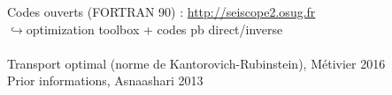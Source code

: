 \begin{frame}
	 	Codes ouverts (FORTRAN 90) : \url{ http://seiscope2.osug.fr}\\
		 $\hookrightarrow$optimization toolbox + codes pb direct/inverse\\~\\
		Transport optimal (norme de Kantorovich-Rubinstein), Métivier 2016\\
		Prior informations, Asnaashari 2013\\

\end{frame}


